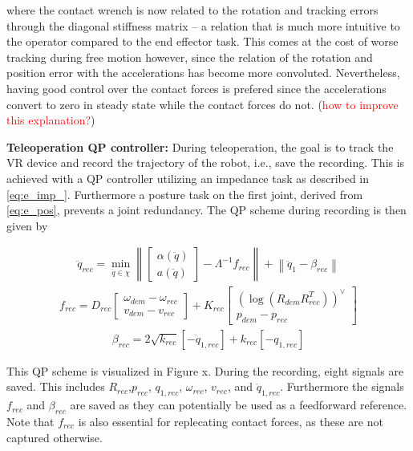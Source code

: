 \documentclass[a4paper, 10pt, conference]{ieeeconf}
\begin{document}
    where the contact wrench is now related to the rotation and tracking errors through the diagonal stiffness matrix -- a relation that is much more intuitive to the operator compared to the end effector task. This comes at the cost of worse tracking during free motion however, since the relation of the rotation and position error with the accelerations has become more convoluted. Nevertheless, having good control over the contact forces is prefered since the accelerations convert to zero in steady state while the contact forces do not. (\textcolor{red}{how to improve this explanation?})

    \textbf{Teleoperation QP controller:}
    During teleoperation, the goal is to track the VR device and record the trajectory of the robot, i.e., save the recording. This is achieved with a QP controller utilizing an impedance task as described in \eqref{eq:e_imp_}. Furthermore a posture task on the first joint, derived from \eqref{eq:e_pos}, prevents a joint redundancy. The QP scheme during recording is then given by

    \begin{align} \label{eq:qp_rec} 
    \ddot{q}_{rec} = \min\limits_{\ddot{q}\in\chi }\left \|  \begin{bmatrix}
    \alpha(\ddot{q})\\ 
    a(\ddot{q})
    \end{bmatrix} - \Lambda^{-1}f_{rec} \right \| + \left \| \ddot{q}_1-\beta_{rec} \right \|
      \end{align}
    \begin{align} 
    f_{rec} =D_{rec} \begin{bmatrix}
    \omega_{dem} - \omega_{rec}
    \\ 
    v_{dem}-v_{rec}
    \end{bmatrix} + K_{rec} \begin{bmatrix}
    (\log({R_{dem}}R_{rec}^T))^{\vee }\\
    p_{dem}-p_{rec}
    \end{bmatrix}
    \end{align}
    \begin{align} 
    \beta_{rec} = 2\sqrt{k_{rec}}\left [ -\dot{q}_{1,rec}  \right ] + k_{rec}\left [ -q_{1,rec}  \right ]
    \end{align}

    This QP scheme is visualized in Figure x. During the recording, eight signals are saved. This includes $R_{rec}$,$p_{rec}$, $q_{1,rec}$, $\omega_{rec}$, $v_{rec}$, and $\dot{q}_{1,rec}$. Furthermore the signals $f_{rec}$ and $\beta_{rec}$ are saved as they can potentially be used as a feedforward reference. Note that $f_{rec}$ is also essential for replecating contact forces, as these are not captured otherwise.
\end{document}
